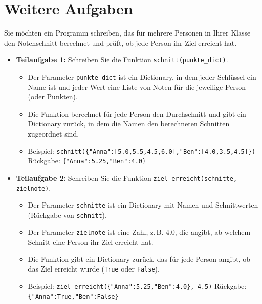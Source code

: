 \section{Weitere Aufgaben}
\begin{myexercise}

	Sie möchten ein Programm schreiben, das für mehrere Personen in Ihrer Klasse den Notenschnitt berechnet und prüft, ob jede Person ihr Ziel erreicht hat.

	\begin{itemize}
		\item \textbf{Teilaufgabe 1:} Schreiben Sie die Funktion \lstinline{schnitt(punkte_dict)}.
		      \begin{itemize}
			      \item Der Parameter \lstinline{punkte_dict} ist ein Dictionary, in dem jeder Schlüssel ein Name ist und jeder Wert eine Liste von Noten für die jeweilige Person (oder Punkten).
			      \item Die Funktion berechnet für jede Person den Durchschnitt und gibt ein Dictionary zurück, in dem die Namen den berechneten Schnitten zugeordnet sind.
			      \item Beispiel: \lstinline|schnitt({"Anna":[5.0,5.5,4.5,6.0],"Ben":[4.0,3.5,4.5]})|
			            \newline Rückgabe: \lstinline|{"Anna":5.25,"Ben":4.0}|
		      \end{itemize}

		\item \textbf{Teilaufgabe 2:} Schreiben Sie die Funktion \lstinline{ziel_erreicht(schnitte, zielnote)}.
		      \begin{itemize}
			      \item Der Parameter \lstinline{schnitte} ist ein Dictionary mit Namen und Schnittwerten (Rückgabe von \lstinline{schnitt}).
			      \item Der Parameter \lstinline{zielnote} ist eine Zahl, z.\,B. 4.0, die angibt, ab welchem Schnitt eine Person ihr Ziel erreicht hat.
			      \item Die Funktion gibt ein Dictionary zurück, das für jede Person angibt, ob das Ziel erreicht wurde (\lstinline{True} oder \lstinline{False}).
			      \item Beispiel: \lstinline|ziel_erreicht({"Anna":5.25,"Ben":4.0}, 4.5)|
			            \newline Rückgabe: \lstinline|{"Anna":True,"Ben":False}|
		      \end{itemize}
	\end{itemize}


\end{myexercise}
